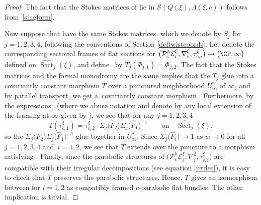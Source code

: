 \begin{proof}
The fact that the Stokes matrices of  lie in $\mathcal{S}(Q(\xi),\Lambda(\xi,c))$ follows from~\eqref{singform}.

Now suppose that  have the same Stokes matrices, which we denote by $S_j$ for $j=1,2,3,4$, following the conventions of Section \ref{deftwistcoords}. Let  denote the corresponding sectorial frames of flat sections for $\bigl(\mathcal{P}^h_{c}\mathcal{E}^{\xi}_i,\nabla^{\xi}_i, \tau_{c,i}^{\xi}\bigr)\to \bigl(\CP,\infty\bigr)$ defined on $\widehat{\operatorname{Sect}}_j(\xi)$, and define~ by $T_j(\Phi_{j,1})=\Phi_{j,2}$. The fact that the Stokes matrices and the formal monodromy are the same implies that the $T_j$ glue into a covariantly constant morphism $T$ over a punctured neighborhood $U_{\infty}^*$ of $\infty$, and by parallel transport, we get a~covariantly constant morphism . Furthermore, by the expressions~ \big(where we abuse notation and denote by  any local extension of the framing at $\infty$ given by \big), we see that for any $j=1,2,3,4$
\begin{equation*}
 T(\tau_{c,1}^{\xi})=\tau_{c,2}^{\xi}\cdot \Sigma_j\bigl(\widehat{F}_2\bigr)\Sigma_j\bigl(\widehat{F}_1\bigr)^{-1}\qquad \text{on}\quad \widehat{\operatorname{Sect}}_j(\xi),
\end{equation*}
so the $\Sigma_j\bigl(\widehat{F}_2\bigr)\Sigma_j\bigl(\widehat{F}_1\bigr)^{-1}$ glue together in $U_{\infty}^*$. Since $\Sigma_j\bigl(\widehat{F}_i\bigr)\to 1$ as $w\to 0$ for all $j=1,2, 3,4$ and~${i\!=\!1,2}$, we see that $T$ extends over the puncture to a morphism satisfying . Finally, since the parabolic structures of $\bigl(\mathcal{P}^h_{c}\mathcal{E}^{\xi}_i,\nabla^{\xi}_i, \tau_{c,i}^{\xi}\bigr)$ are compatible with their irregular decompositions (see equation \eqref{irrdec}), it is easy to check that $T$ preserves the parabolic structures. Hence, $T$ gives an isomorphism between  for $i=1,2$ as compatibly framed $c$-parabolic flat bundles. The other implication is trivial.


\end{proof}
